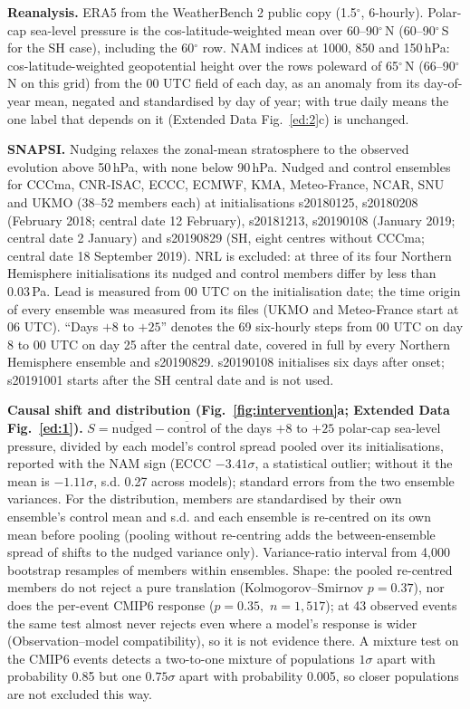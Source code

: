 \documentclass[11pt]{article}
\begin{document}
\textbf{Reanalysis.} ERA5\cite{hersbach20} from the WeatherBench 2 public copy\cite{rasp24} (1.5$^\circ$, 6-hourly). Polar-cap sea-level pressure is the cos-latitude-weighted mean over 60–90$^\circ$\,N (60–90$^\circ$\,S for the SH case), including the 60$^\circ$ row. NAM indices at 1000, 850 and 150\,hPa: cos-latitude-weighted geopotential height over the rows poleward of 65$^\circ$\,N (66–90$^\circ$\,N on this grid) from the 00 UTC field of each day, as an anomaly from its day-of-year mean, negated and standardised by day of year; with true daily means the one label that depends on it (Extended Data Fig.~\ref{ed:2}c) is unchanged.

\textbf{SNAPSI.} Nudging relaxes the zonal-mean stratosphere to the observed evolution above 50\,hPa, with none below 90\,hPa\cite{hitchcock22}. Nudged and control ensembles for CCCma, CNR-ISAC, ECCC, ECMWF, KMA, Meteo-France, NCAR, SNU and UKMO (38–52 members each) at initialisations s20180125, s20180208 (February 2018; central date 12 February), s20181213, s20190108 (January 2019; central date 2 January) and s20190829 (SH, eight centres without CCCma; central date 18 September 2019). NRL is excluded: at three of its four Northern Hemisphere initialisations its nudged and control members differ by less than 0.03\,Pa. Lead is measured from 00 UTC on the initialisation date; the time origin of every ensemble was measured from its files (UKMO and Meteo-France start at 06 UTC). “Days $+8$ to $+25$” denotes the 69 six-hourly steps from 00 UTC on day 8 to 00 UTC on day 25 after the central date, covered in full by every Northern Hemisphere ensemble and s20190829. s20190108 initialises six days after onset; s20191001 starts after the SH central date and is not used.

\textbf{Causal shift and distribution (Fig.~\ref{fig:intervention}a; Extended Data Fig.~\ref{ed:1}).} $S = \overline{\text{nudged}} - \overline{\text{control}}$ of the days $+8$ to $+25$ polar-cap sea-level pressure, divided by each model's control spread pooled over its initialisations, reported with the NAM sign (ECCC $-3.41\sigma$, a statistical outlier; without it the mean is $-1.11\sigma$, s.d. 0.27 across models); standard errors from the two ensemble variances. For the distribution, members are standardised by their own ensemble's control mean and s.d. and each ensemble is re-centred on its own mean before pooling (pooling without re-centring adds the between-ensemble spread of shifts to the nudged variance only). Variance-ratio interval from 4,000 bootstrap resamples of members within ensembles. Shape: the pooled re-centred members do not reject a pure translation (Kolmogorov–Smirnov $p = 0.37$), nor does the per-event CMIP6 response ($p = 0.35,$ $n = 1{,}517$); at 43 observed events the same test almost never rejects even where a model's response is wider (Observation–model compatibility), so it is not evidence there. A mixture test on the CMIP6 events detects a two-to-one mixture of populations $1\sigma$ apart with probability 0.85 but one $0.75\sigma$ apart with probability 0.005, so closer populations are not excluded this way.
\end{document}
